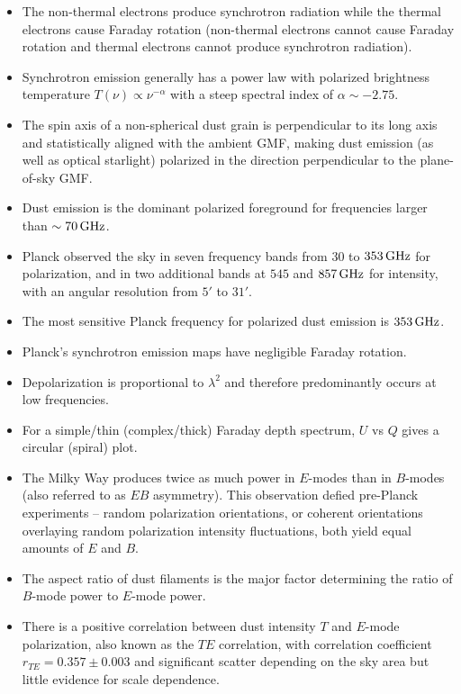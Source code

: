 \documentclass[a4paper,10pt]{article}
\begin{document}
\begin{itemize} \itemsep0em
	\item The non-thermal electrons produce synchrotron radiation while the thermal electrons cause Faraday rotation (non-thermal electrons cannot cause Faraday rotation and thermal electrons cannot produce synchrotron radiation).
	\item Synchrotron emission generally has a power law with polarized brightness temperature $T(\nu)\propto\nu^{-\alpha}$ with a steep spectral index of $\alpha\sim-2.75$.
	\item The spin axis of a non-spherical dust grain is perpendicular to its long axis and statistically aligned with the ambient GMF, making dust emission (as well as optical starlight) polarized in the direction perpendicular to the plane-of-sky GMF.
	\item Dust emission is the dominant polarized foreground for frequencies larger than $\sim70\,{\rm GHz}$.
	\item Planck observed the sky in seven frequency bands from $30$ to $353\,{\rm GHz}$ for polarization, and in two additional bands at $545$ and $857\,{\rm GHz}$ for intensity, with an angular resolution from $5'$ to $31'$.
	\item The most sensitive Planck frequency for polarized dust emission is $353\,{\rm GHz}$.
	\item Planck's synchrotron emission maps have negligible Faraday rotation.
	\item Depolarization is proportional to $\lambda^2$ and therefore predominantly occurs at low frequencies.
	\item For a simple/thin (complex/thick) Faraday depth spectrum, $U$ vs $Q$ gives a circular (spiral) plot.
	\item The Milky Way produces twice as much power in $E$-modes than in $B$-modes (also referred to as $EB$ asymmetry). This observation defied pre-Planck experiments -- random polarization orientations, or coherent orientations overlaying random polarization intensity fluctuations, both yield equal amounts of $E$ and $B$. 
	\item The aspect ratio of dust filaments is the major factor determining the ratio of $B$-mode power to $E$-mode power.
	\item There is a positive correlation between dust intensity $T$ and $E$-mode polarization, also known as the $TE$ correlation, with correlation coefficient $r_{TE} = 0.357\pm0.003$ and significant scatter depending on the sky area but little evidence for scale dependence.

\end{itemize}
\end{document}
